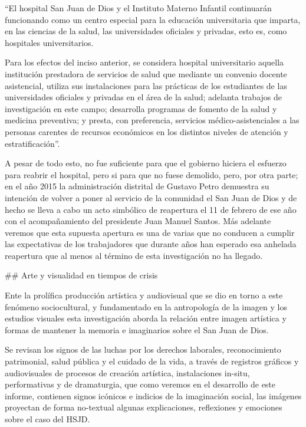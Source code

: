 “El hospital San Juan de Dios y el Instituto Materno Infantil continuarán funcionando como un centro especial para la educación universitaria que imparta, en las ciencias de la salud, las universidades oficiales y privadas, esto es, como hospitales universitarios.

Para los efectos del inciso anterior, se considera hospital universitario aquella institución prestadora de servicios de salud que mediante un convenio docente asistencial, utiliza sus instalaciones para las prácticas de los estudiantes de las universidades oficiales y privadas en el área de la salud; adelanta trabajos de investigación en este campo; desarrolla programas de fomento de la salud y medicina preventiva; y presta, con preferencia, servicios médico-asistenciales a las personas carentes de recursos económicos en los distintos niveles de atención y estratificación”.

A pesar de todo esto, no fue suficiente para que el gobierno hiciera el esfuerzo para reabrir el hospital, pero si para que no fuese demolido, pero, por otra parte; en el año 2015 la administración distrital de Gustavo Petro demuestra su intención de volver a poner al servicio de la comunidad el San Juan de Dios y de hecho se lleva a cabo un acto simbólico de reapertura el 11 de febrero de ese año con el acompañamiento del presidente Juan Manuel Santos. Más adelante veremos que esta supuesta apertura es una de varias que no conducen a cumplir las expectativas de los trabajadores que durante años han esperado esa anhelada reapertura que al menos al término de esta investigación no ha llegado.

## Arte y visualidad en tiempos de crisis

Ente la prolífica producción artística y audiovisual que se dio en torno a este fenómeno sociocultural, y fundamentado en la antropología de la imagen y los estudios visuales esta investigación aborda la relación entre imagen artística y formas de mantener la memoria e imaginarios sobre el San Juan de Dios.

Se revisan los signos de las luchas por los derechos laborales, reconocimiento patrimonial, salud pública y el cuidado de la vida, a través de registros gráficos y audiovisuales de procesos de creación artística, instalaciones in-situ, performativas y de dramaturgia, que como veremos en el desarrollo de este informe, contienen signos icónicos e indicios de la imaginación social, las imágenes proyectan de forma no-textual algunas explicaciones, reflexiones y emociones sobre el caso del HSJD.

